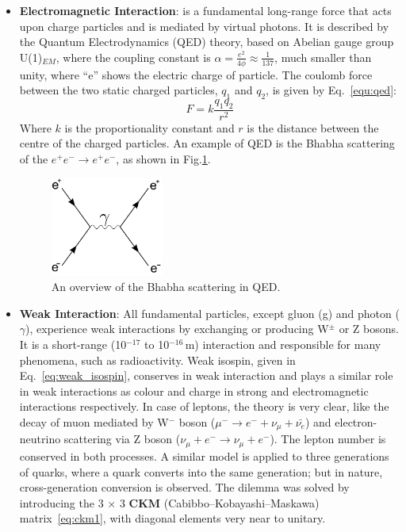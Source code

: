 \begin{itemize}
\item{\textbf{Electromagnetic Interaction}}: is a fundamental long-range force that acts upon charge particles and is mediated by virtual photons. It is described by the Quantum Electrodynamics (QED) theory, based on Abelian gauge group U(1)$_{EM}$, where the coupling constant is $\alpha = \frac{e^{2}}{4\phi} \approx \frac{1}{137}$, much smaller than unity, where ``e'' shows the electric charge of particle. The coulomb force between the two static charged particles, $q_1$ and $q_2$, is given by Eq.~\ref{equ:qed}:
\begin{equation}\label{equ:qed}
F = k\frac{q_1 q_2}{r^2}
\end{equation}
Where $k$ is the proportionality constant and $r$ is the distance between the centre of the charged particles.
An example of QED is the Bhabha scattering of the $e^{+}e^{-} \rightarrow e^{+}e^{-}$, as shown in Fig.\ref{fig:electro_force}.
\begin{figure}[h!]
\centering
\includegraphics[width=0.35\textwidth]{fig/sm_beyond/electromagnetic.png}
\caption{\label{fig:electro_force} An overview of the Bhabha scattering in QED.}
\end{figure}
\item{\textbf{Weak Interaction}}:
All fundamental particles, except gluon (g) and photon ($\gamma$), experience weak interactions by exchanging or producing W$^{\pm}$ or Z bosons. It is a short-range (10$^{-17}$ to 10$^{-16}$\,m) interaction and responsible for many phenomena, such as radioactivity. Weak isospin, given in Eq.~\ref{eq:weak_isospin}, conserves in weak interaction and plays a similar role in weak interactions as colour and charge in strong and electromagnetic interactions respectively. In case of leptons, the theory is very clear, like the decay of muon mediated by W$^{-}$ boson ($\mu^{-} \rightarrow e^{-} + \nu_{\mu} + \bar{\nu_{e}}$) and electron-neutrino scattering via Z boson ($\nu_{\mu} + e^{-} \rightarrow \nu_{\mu} + e^{-}$). The lepton number is conserved in both processes. A similar model is applied to three generations of quarks, where a quark converts into the same generation; but in nature, cross-generation conversion is observed. The dilemma was solved by introducing the 3 $\times$ 3 $\textbf{CKM}$ (Cabibbo–Kobayashi–Maskawa) matrix~\ref{eq:ckm1}, with diagonal elements very near to unitary.

\end{itemize}
